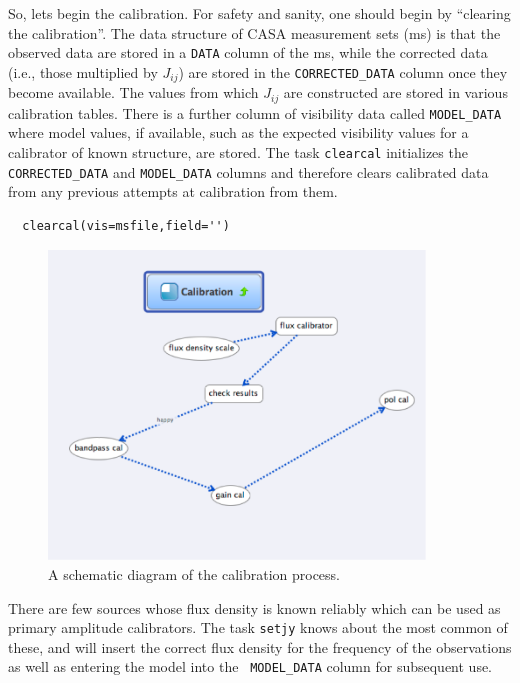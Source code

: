 \documentclass[force,almostfull,justified]{tufte-book}
\begin{document}
So, lets begin the calibration. For safety and sanity, one should begin by ``clearing the
calibration''.  The data structure of CASA measurement sets (ms) is that the observed data are stored
in a {\tt DATA} column of the ms, while the corrected data (i.e., those multiplied by $J_{ij}$) are
stored in the {\tt CORRECTED\_DATA} column once they become available.  The values from which $J_{ij}$
are constructed are stored in various calibration tables.  There is a further column of visibility
data called {\tt MODEL\_DATA} where model values, if available, such as the expected visibility values
for a calibrator of known structure, are stored.  The task {\tt clearcal} initializes the {\tt
CORRECTED\_DATA} and {\tt MODEL\_DATA} columns and therefore clears calibrated data from any previous
attempts at calibration from them.

\begin{casacmd}
\begin{verbatim}
  clearcal(vis=msfile,field='')
\end{verbatim}
\end{casacmd}

\begin{figure}
  \includegraphics[width=10.0cm]{images/casa_cal}
  \caption[Mind map.]{A schematic diagram of the calibration process.}
  \label{fig:textfig}
\end{figure}

\bigskip
{}

\medskip

There are few sources whose flux density is known reliably which can be used as primary amplitude
calibrators.  The task {\tt setjy} knows about the most common of these, and will insert the correct
flux density for the frequency of the observations as well as entering the model into the {\tt
MODEL\_DATA} column for subsequent use.
\end{document}
